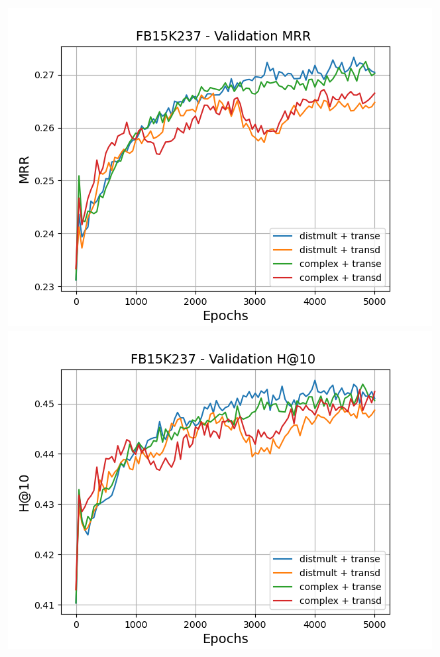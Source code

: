 \begin{figure}[H]
    \centering
    \begin{minipage}{.5\textwidth}
      \centering
      \includegraphics[width=\linewidth]{figures/results/gan_train/pretrained/random/fb15k237/gan_train_random_fb15k237_mrrs.png}
    \end{minipage}%
    \begin{minipage}{.5\textwidth}
      \centering
      \includegraphics[width=\linewidth]{figures/results/gan_train/pretrained/random/fb15k237/gan_train_random_fb15k237_hit10s.png}
    \end{minipage}
    

\end{figure}
